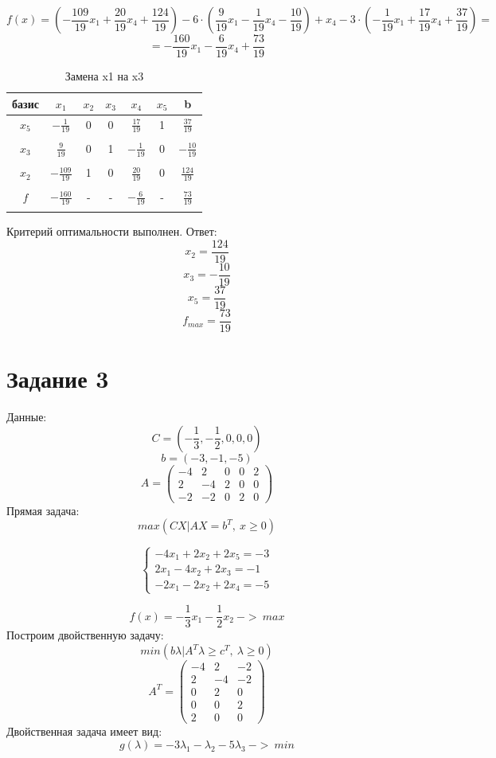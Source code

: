 \documentclass{article}
\begin{document}
\[f(x) = (-\frac{109}{19}x_1 + \frac{20}{19}x_4 + \frac{124}{19})-6\cdot(\frac{9}{19}x_1 -\frac{1}{19}x_4 - \frac{10}{19})+x_4-3\cdot (-\frac{1}{19}x_1 + \frac{17}{19}x_4 + \frac{37}{19}) =\]
\[= -\frac{160}{19}x_1 - \frac{6}{19}x_4 + \frac{73}{19}\]
\begin{table}[H]
    \centering
    \caption{Замена x1 на x3}
    \begin{tabular}{|c|c|c|c|c|c|c|}
    \hline
        базис & $x_1$ & $x_2$ & $x_3$ & $x_4$ & $x_5$ & b \\ \hline
        $x_5$ & $-\frac{1}{19}$	&0&	0	&$\frac{17}{19}$&	1	&$\frac{37}{19}$ \\
          &	&&	&&		&\\\hline
        $x_3$ & $\frac{9}{19}$	&0&	1	&$-\frac{1}{19}$	&0&	$- \frac{10}{19}$ \\
        &	&&	&&		&\\\hline
        $x_2$  & $-\frac{109}{19}$&1	&0	&$\frac{20}{19}$&0	&$\frac{124}{19}$ \\ 
        &	&&	&&		&\\\hline
        $f$  & $-\frac{160}{19}$&-	&-	&$ - \frac{6}{19}$&-	&$\frac{73}{19}$ \\ 
        &	&&	&&		&\\\hline
    \end{tabular}
\end{table}
Критерий оптимальности выполнен.
Ответ:
\[x_2 = \frac{124}{19}\]
\[x_3 = -\frac{10}{19}\]
\[x_5 = \frac{37}{19}\]
\[f_{max} = \frac{73}{19}\]

\section*{Задание 3}

Данные:
\[C = (-\frac{1}{3}, -\frac{1}{2}, 0, 0, 0)\]
\[b = (-3, -1 ,-5)\]
\[A = \begin{pmatrix}
    -4&2&0&0&2\\
    2&-4&2&0&0\\
    -2&-2&0&2&0
\end{pmatrix}\]
Прямая задача:
\[max(CX|AX = b^T,\ x\geq 0)\]

\[\begin{cases}
    -4x_1+2x_2+2x_5 = -3\\
    2x_1 -4x_2+2x_3 = -1\\
    -2x_1-2x_2+2x_4 = -5
\end{cases}\]

\[f(x) = -\frac{1}{3}x_1 - \frac{1}{2}x_2\ ->\ max\]
Построим двойственную задачу: 
\[min(b\lambda | A^T \lambda \geq c^T,\ \lambda \geq 0)\]
\[A^T = \begin{pmatrix}
    -4&2&-2\\
    2&-4&-2\\
    0&2&0\\
    0&0&2\\
    2&0&0
\end{pmatrix}\]
Двойственная задача имеет вид:
\[g(\lambda) = -3\lambda_1 - \lambda_2 - 5\lambda_3\ ->\ min\]
\end{document}
